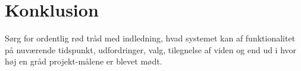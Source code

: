 \graphicspath{{Chapters/Alternative/}}


\section{Konklusion}



Sørg for ordentlig rød tråd med indledning, hvad systemet kan af funktionalitet på nuværende tidspunkt, udfordringer, valg, tilegnelse af viden og end ud i hvor høj en gråd projekt-målene er blevet mødt.